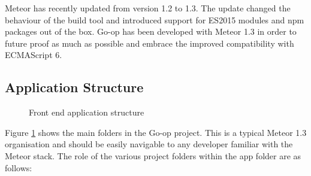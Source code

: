 Meteor has recently updated from version 1.2 to 1.3. The update changed the behaviour of the build tool and introduced support for ES2015 modules and npm packages out of the box. Go-op has been developed with Meteor 1.3 in order to future proof as much as possible and embrace the improved compatibility with ECMAScript 6.\\

\subsection{Application Structure}
\begin{figure}
\centering
{}
\decoRule
\caption[Front End Application Structure]{Front end application structure}
\label{fig:AppStructure}
\end{figure}

Figure \ref{fig:AppStructure} shows the main folders in the Go-op project. This is a typical Meteor 1.3 organisation and should be easily navigable to any developer familiar with the Meteor stack. The role of the various project folders within the app folder are as follows: \\

